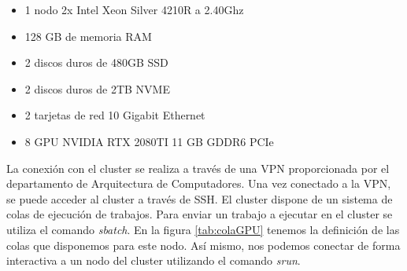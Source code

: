 \begin{itemize}
    \item 1 nodo 2x Intel Xeon Silver 4210R a 2.40Ghz
    \item 128 GB de memoria RAM
    \item 2 discos duros de 480GB SSD
    \item 2 discos duros de 2TB NVME
    \item 2 tarjetas de red 10 Gigabit Ethernet
    \item 8 GPU NVIDIA RTX 2080TI 11 GB GDDR6 PCIe
\end{itemize}

La conexión con el cluster se realiza a través de una VPN proporcionada por el departamento
de Arquitectura de Computadores. Una vez conectado a la VPN, se puede acceder al cluster
a través de SSH. El cluster dispone de un sistema de colas de ejecución de trabajos. Para
enviar un trabajo a ejecutar en el cluster se utiliza el comando \textit{sbatch}. En la figura
\ref{tab:colaGPU} tenemos la definición de las colas que disponemos para este nodo. Así mismo,
nos podemos conectar de forma interactiva a un nodo del cluster utilizando el comando
\textit{srun}.

\begin{table}[H]
    \centering
    \caption[Colas definidas en el nodo de GPU's]{Colas definidas en el nodo de GPU's (Elaboración propia)}
    \label{tab:colaGPU}
\end{table}

